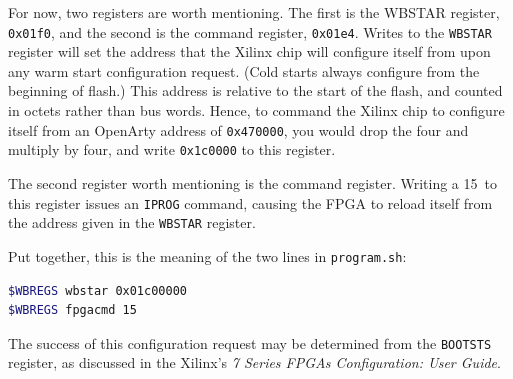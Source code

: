 \documentclass{gqtekspec}
\begin{document}
For now, two registers are worth mentioning.  The first is the WBSTAR register,
{\tt 0x01f0}, and the second is the command register, {\tt 0x01e4}.
Writes to the {\tt WBSTAR} register will set the address that the Xilinx
chip will configure itself from upon any warm start configuration request.
(Cold starts always configure from the beginning of flash.)  This address
is relative to the start of the flash, and counted in octets rather than
bus words.  Hence, to command the Xilinx chip to configure itself from an
OpenArty address of {\tt 0x470000}, you would drop the four and multiply by
four, and write {\tt 0x1c0000} to this register.

The second register worth mentioning is the command register.  Writing a
15~to this register issues an {\tt IPROG} command, causing the FPGA to 
reload itself from the address given in the {\tt WBSTAR} register.

Put together, this is the meaning of the two lines in {\tt program.sh}:
\begin{lstlisting}[language=bash]
$WBREGS wbstar 0x01c00000
$WBREGS fpgacmd 15
\end{lstlisting}

The success of this configuration request may be determined from the
{\tt BOOTSTS} register, as discussed in the Xilinx's
{\em 7 Series FPGAs Configuration: User Guide}.
\end{document}
